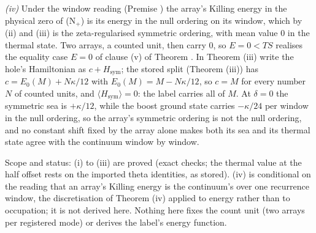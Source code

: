 \emph{(iv)} Under the window reading (Premise ) the array's Killing energy in the physical zero of (N$_{+}$) is its energy in the null ordering on its window, which by (ii) and (iii) is the zeta-regularised symmetric ordering, with mean value $0$ in the thermal state. Two arrays, a counted unit, then carry $0$, so $E = 0 < TS$ realises the equality case $E = 0$ of clause (v) of Theorem . In Theorem (iii) write the hole's Hamiltonian as $c + H_{\mathrm{sym}}$; the stored split (Theorem (iii)) has $c = E_{0}(M) + N\kappa/12$ with $E_{0}(M) = M - N\kappa/12$, so $c = M$ for every number $N$ of counted units, and $\langle H_{\mathrm{sym}}\rangle = 0$: the label carries all of $M$. At $\delta = 0$ the symmetric sea is $+\kappa/12$, while the boost ground state carries $-\kappa/24$ per window in the null ordering, so the array's symmetric ordering is not the null ordering, and no constant shift fixed by the array alone makes both its sea and its thermal state agree with the continuum window by window.

Scope and status: (i) to (iii) are proved (exact checks; the thermal value at the half offset rests on the imported theta identities, as stored). (iv) is conditional on the reading that an array's Killing energy is the continuum's over one recurrence window, the discretisation of Theorem (iv) applied to energy rather than to occupation; it is not derived here. Nothing here fixes the count unit (two arrays per registered mode) or derives the label's energy function.
